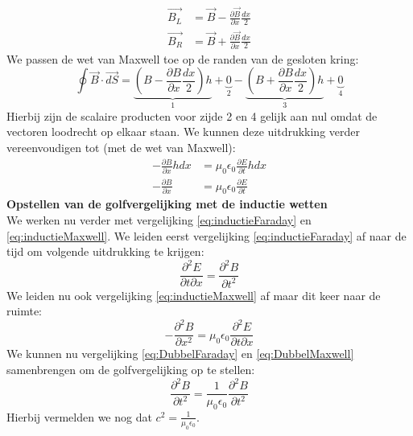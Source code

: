 \documentclass[a4paper,kul]{kulakarticle} %
\begin{document}
\begin{align*}
	\vec{B_L} &= \vec{B}-\frac{\partial\vec{B}}{\partial x}\frac{dx}{2}\\
	\vec{B_R} &= \vec{B}+\frac{\partial\vec{B}}{\partial x}\frac{dx}{2}	
\end{align*}
We passen de wet van Maxwell toe op de randen van de gesloten kring:
\begin{equation*}
	\oint\vec{B}\cdot\vec{dS} = \underbrace{(B-\frac{\partial B}{\partial x}\frac{dx}{2})h}_1 + \underbrace{0}_2 -\underbrace{(B+\frac{\partial B}{\partial x}\frac{dx}{2})h}_3 + \underbrace{0}_4
\end{equation*}
Hierbij zijn de scalaire producten voor zijde 2 en 4 gelijk aan nul omdat de vectoren loodrecht op elkaar staan. We kunnen deze uitdrukking verder vereenvoudigen tot (met de wet van Maxwell):
\begin{align}
	-\frac{\partial B}{\partial x}hdx &= \mu_0\epsilon_0\frac{\partial E}{\partial t}hdx\\
	\label{eq:inductieMaxwell}
	-\frac{\partial B}{\partial x} &= \mu_0\epsilon_0\frac{\partial E}{\partial t}
\end{align}
\newpage
\textbf{Opstellen van de golfvergelijking met de inductie wetten}\\
We werken nu verder met vergelijking \ref{eq:inductieFaraday} en \ref{eq:inductieMaxwell}. We leiden eerst vergelijking \ref{eq:inductieFaraday} af naar de tijd om volgende uitdrukking te krijgen:
\begin{equation}
	\label{eq:DubbelFaraday}
	\frac{\partial^2E}{\partial t\partial x} = \frac{\partial^2B}{\partial t^2}
\end{equation}
We leiden nu ook vergelijking \ref{eq:inductieMaxwell} af maar dit keer naar de ruimte:
\begin{equation}
	\label{eq:DubbelMaxwell}
	-\frac{\partial^2B}{\partial x^2} = \mu_0\epsilon_0\frac{\partial^2E}{\partial t\partial x}
\end{equation}
We kunnen nu vergelijking \ref{eq:DubbelFaraday} en \ref{eq:DubbelMaxwell} samenbrengen om de golfvergelijking op te stellen:
\begin{equation*}
	\frac{\partial^2B}{\partial t^2}=\frac{1}{\mu_0\epsilon_0}\frac{\partial^2B}{\partial t^2}
\end{equation*}
Hierbij vermelden we nog dat $c^2=\frac{1}{\mu_0\epsilon_0}$.
\newpage
\end{document}
